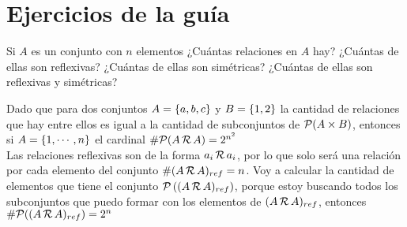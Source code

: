 \documentclass[12pt,a4paper, spanish]{article}
\begin{document}
\section*{Ejercicios de la guía}

\ejercicio

\ejercicio
\ejercicio
\ejercicio
\ejercicio
\ejercicio
\ejercicio
\ejercicio


\ejercicio
Si $A$ es un conjunto con $n$ elementos ¿Cuántas relaciones en $A$ hay?
¿Cuántas de ellas son reflexivas?
¿Cuántas de  ellas son simétricas? ¿Cuántas de ellas son reflexivas y simétricas? \\

\separadorCorto

Dado que para dos conjuntos $A = \left\{ a,b,c \right\}$ y $B = \left\{ 1,2 \right\}$ la cantidad de relaciones
que hay entre ellos es igual a la cantidad de subconjuntos de $\mathcal P(A \times B)$, entonces si
$A = \left\{ 1,\cdots, n \right\}$ el cardinal $\# \mathcal P(A \,\mathcal{R}\, A ) = 2^{n^2}$\\

Las relaciones reflexivas son de la forma $a_i \,\mathcal{R}\, a_i$, por lo que solo será una relación por cada
elemento del conjunto $\# (A \,\mathcal{R}\, A)_{ref} = n$. Voy a calcular la cantidad de elementos que tiene
el conjunto $\mathcal P \left(  (A \,\mathcal{R}\, A)_{ref}  \right)$, porque estoy buscando todos los subconjuntos que puedo
formar con los elementos de $(A \,\mathcal{R}\, A)_{ref}$, entonces $ \#\mathcal P((A \,\mathcal{R}\, A)_{ref}) = 2^n$\\
\end{document}
